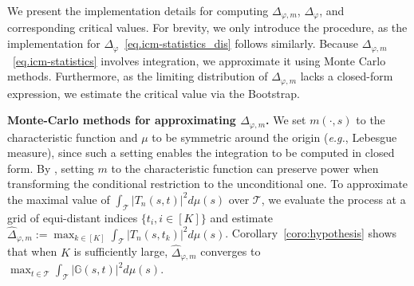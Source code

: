 \documentclass[
  12pt]{article}
\newtheorem{remark}{Remark}
\def\T{\mathbf{T}}
\def\wh{\widehat}
\def\mG{\mathbb{G}}
\def\cT{\mathcal{T}}
\begin{document}
We present the implementation details for computing $\Delta_{\varphi,m}$, $\Delta_{\varphi}$, and corresponding critical values. For brevity, we only introduce the procedure, as the implementation for $\Delta_{\varphi}$~\eqref{eq.icm-statistics_dis} follows similarly. Because $\Delta_{\varphi,m}$~\eqref{eq.icm-statistics} involves integration, we approximate it using Monte Carlo methods. Furthermore, as the limiting distribution of $\Delta_{\varphi,m}$ lacks a closed-form expression, we estimate the critical value via the Bootstrap.






\textbf{Monte-Carlo methods for approximating $\Delta_{\varphi,m}$.} We set $m(\cdot,s)$ to the characteristic function and $\mu$ to be symmetric around the origin (\emph{e.g.}, Lebesgue measure), since such a setting enables the integration to be computed in closed form. By \cite{stinchcombe1998consistent}, setting $m$ to the characteristic function can preserve power when transforming the conditional restriction to the unconditional one. To approximate the maximal value of $\int_{\cT} |T_n(s,t)|^2d\mu(s)$ over $\cT$, we evaluate the process at a grid of equi-distant indices $\{t_i,i\in [K]\}$ and estimate $\wh{\Delta}_{\varphi,m}:=\max_{k\in [K]} \int_{\cT} |T_n(s,t_k)|^2d\mu(s)$. Corollary~\ref{coro:hypothesis} shows that when $K$ is sufficiently large, $\wh{\Delta}_{\varphi,m}$ converges to $\max_{t \in \cT} \int_{\cT}  |\mG(s,t)|^2 d\mu(s)$. 

\end{document}
